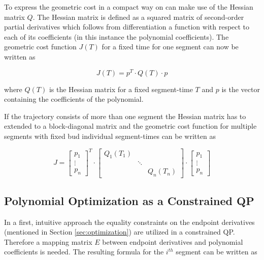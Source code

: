 To express the geometric cost in a compact way on can make use of the Hessian matrix $Q$. The Hessian matrix is defined as a squared matrix of second-order partial derivatives which follows from differentiation a function with respect to each of its coefficients (in this instance the polynomial coefficients). The geometric cost function $J(T)$ for a fixed time for one segment can now be written as

\begin{equation}
J(T)  = p^T \cdot Q(T) \cdot p
\end{equation}

where $Q(T)$ is the Hessian matrix for a fixed segment-time $T$ and $p$ is the vector containing the coefficients of the polynomial. \newline

If the trajectory consists of more than one segment the Hessian matrix has to extended to a block-diagonal matrix and the geometric cost function for multiple segments with fixed bud individual segment-times can be written as

\begin{equation}
J =
\begin{bmatrix}
   p_1 \\
\vdots \\
  p_n
\end{bmatrix}^T
\cdot
\begin{bmatrix}
   Q_1(T_1) &  &  \\
    & \ddots &  \\
   & & Q_n(T_n)
\end{bmatrix} 
\cdot
\begin{bmatrix}
   p_1 \\
\vdots \\
  p_n
\end{bmatrix}
\label{equ:cost}
\end{equation}


\subsection{Polynomial Optimization as a Constrained QP}

In a first, intuitive approach the equality constraints on the endpoint derivatives (mentioned in Section \ref{sec:optimization}) are utilized in a constrained QP. Therefore a mapping matrix $E$ between endpoint derivatives and polynomial coefficients is needed. The resulting formula for the $i^{th}$ segment can be written as


